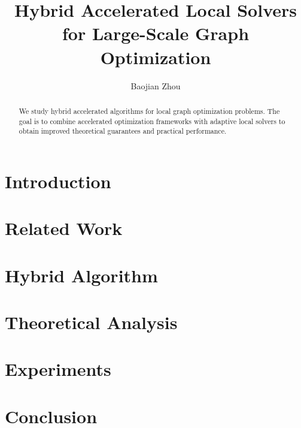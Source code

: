\documentclass[twoside,11pt]{article}
\title{Hybrid Accelerated Local Solvers for Large-Scale Graph Optimization}
\author{Baojian Zhou}
\begin{document}
\maketitle

\begin{abstract}
We study hybrid accelerated algorithms for local graph optimization problems.
The goal is to combine accelerated optimization frameworks with adaptive local
solvers to obtain improved theoretical guarantees and practical performance.
\end{abstract}

\section{Introduction}


\section{Related Work}


\section{Hybrid Algorithm}


\section{Theoretical Analysis}


\section{Experiments}


\section{Conclusion}




\appendix

\end{document}
